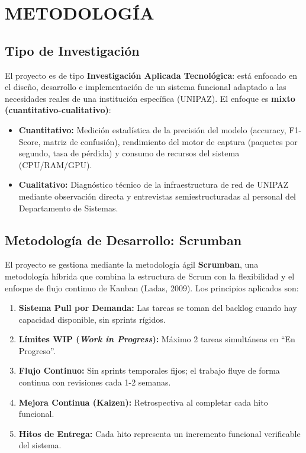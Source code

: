 \documentclass[12pt, letterpaper, oneside]{report}
\begin{document}
\chapter{METODOLOGÍA}

\section{Tipo de Investigación}

El proyecto es de tipo \textbf{Investigación Aplicada Tecnológica}: está enfocado en el diseño, desarrollo e implementación de un sistema funcional adaptado a las necesidades reales de una institución específica (UNIPAZ). El enfoque es \textbf{mixto (cuantitativo-cualitativo)}:

\begin{itemize}[leftmargin=*]
  \item \textbf{Cuantitativo:} Medición estadística de la precisión del modelo (accuracy, F1-Score, matriz de confusión), rendimiento del motor de captura (paquetes por segundo, tasa de pérdida) y consumo de recursos del sistema (CPU/RAM/GPU).
  \item \textbf{Cualitativo:} Diagnóstico técnico de la infraestructura de red de UNIPAZ mediante observación directa y entrevistas semiestructuradas al personal del Departamento de Sistemas.
\end{itemize}

\section{Metodología de Desarrollo: Scrumban}

El proyecto se gestiona mediante la metodología ágil \textbf{Scrumban}, una metodología híbrida que combina la estructura de Scrum con la flexibilidad y el enfoque de flujo continuo de Kanban (Ladas, 2009). Los principios aplicados son:

\begin{enumerate}[leftmargin=*, label=\textbf{\arabic*.}]
  \item \textbf{Sistema Pull por Demanda:} Las tareas se toman del backlog cuando hay capacidad disponible, sin sprints rígidos.
  \item \textbf{Límites WIP (\textit{Work in Progress}):} Máximo 2 tareas simultáneas en ``En Progreso''.
  \item \textbf{Flujo Continuo:} Sin sprints temporales fijos; el trabajo fluye de forma continua con revisiones cada 1-2 semanas.
  \item \textbf{Mejora Continua (Kaizen):} Retrospectiva al completar cada hito funcional.
  \item \textbf{Hitos de Entrega:} Cada hito representa un incremento funcional verificable del sistema.
\end{enumerate}
\end{document}
